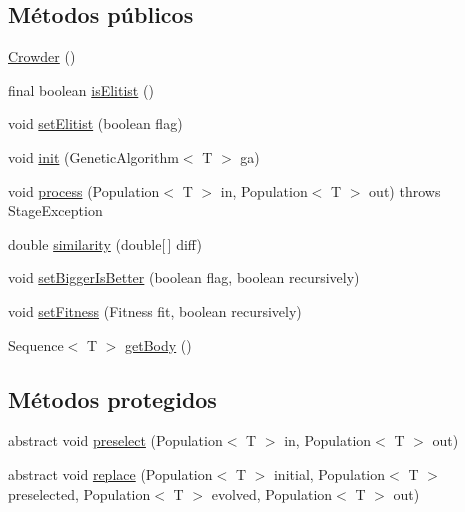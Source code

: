 \subsection*{Métodos públicos}
\begin{DoxyCompactItemize}
\item 
\hyperlink{classjenes_1_1stage_1_1operator_1_1_crowder_3_01_t_01extends_01_chromosome_01_4_a6e23e3544b98e1a415c53fcedd541df5}{Crowder} ()
\item 
final boolean \hyperlink{classjenes_1_1stage_1_1operator_1_1_crowder_3_01_t_01extends_01_chromosome_01_4_ab9bb2a8d6bf09a51158ef49917095913}{is\-Elitist} ()
\item 
void \hyperlink{classjenes_1_1stage_1_1operator_1_1_crowder_3_01_t_01extends_01_chromosome_01_4_ad995907f114cdd40eb03d53f05734b8c}{set\-Elitist} (boolean flag)
\item 
void \hyperlink{classjenes_1_1stage_1_1operator_1_1_crowder_3_01_t_01extends_01_chromosome_01_4_a345ecb8e82d64130d171fb785f2702e6}{init} (Genetic\-Algorithm$<$ T $>$ ga)
\item 
void \hyperlink{classjenes_1_1stage_1_1operator_1_1_crowder_3_01_t_01extends_01_chromosome_01_4_a21f0859b05e06d7ee4b979d5a2d559d7}{process} (Population$<$ T $>$ in, Population$<$ T $>$ out)  throws Stage\-Exception 
\item 
double \hyperlink{classjenes_1_1stage_1_1operator_1_1_crowder_3_01_t_01extends_01_chromosome_01_4_a99b3aaad504589efa9c408fc1b4e2fa1}{similarity} (double\mbox{[}$\,$\mbox{]} diff)
\item 
void \hyperlink{classjenes_1_1stage_1_1operator_1_1_crowder_3_01_t_01extends_01_chromosome_01_4_a65ef754570b25a6f14fbd78e6c08c4f9}{set\-Bigger\-Is\-Better} (boolean flag, boolean recursively)
\item 
void \hyperlink{classjenes_1_1stage_1_1operator_1_1_crowder_3_01_t_01extends_01_chromosome_01_4_ac6c89c383d27754be63fabc951e11dc8}{set\-Fitness} (Fitness fit, boolean recursively)
\item 
Sequence$<$ T $>$ \hyperlink{classjenes_1_1stage_1_1operator_1_1_crowder_3_01_t_01extends_01_chromosome_01_4_a4b24910de47aff7c5a709846af74b199}{get\-Body} ()
\end{DoxyCompactItemize}
\subsection*{Métodos protegidos}
\begin{DoxyCompactItemize}
\item 
abstract void \hyperlink{classjenes_1_1stage_1_1operator_1_1_crowder_3_01_t_01extends_01_chromosome_01_4_ae72da3620314eba33b17297eb6a52aa0}{preselect} (Population$<$ T $>$ in, Population$<$ T $>$ out)
\item 
abstract void \hyperlink{classjenes_1_1stage_1_1operator_1_1_crowder_3_01_t_01extends_01_chromosome_01_4_a2eec13cd60faaeefc6bb00302831740f}{replace} (Population$<$ T $>$ initial, Population$<$ T $>$ preselected, Population$<$ T $>$ evolved, Population$<$ T $>$ out)
\end{DoxyCompactItemize}
